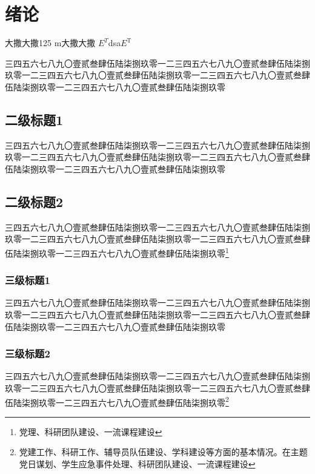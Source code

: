 \documentclass[master,academic]{ysuthesis} %
\begin{document}

	\customizedtableofcontents

	\chapter{绪论}
		大撒大撒125 m大撒大撒 $E^T$dsa$E^{\mathrm{T}}$

		三四五六七八九〇壹贰叁肆伍陆柒捌玖零一二三四五六七八九〇壹贰叁肆伍陆柒捌玖零一二三四五六七八九〇壹贰叁肆伍陆柒捌玖零一二三四五六七八九〇壹贰叁肆伍陆柒捌玖零一二三四五六七八九〇壹贰叁肆伍陆柒捌玖零

	\section{二级标题1}

		三四五六七八九〇壹贰叁肆伍陆柒捌玖零一二三四五六七八九〇壹贰叁肆伍陆柒捌玖零一二三四五六七八九〇壹贰叁肆伍陆柒捌玖零一二三四五六七八九〇壹贰叁肆伍陆柒捌玖零一二三四五六七八九〇壹贰叁肆伍陆柒捌玖零

	\section{二级标题2}

		三四五六七八九〇壹贰叁肆伍陆柒捌玖零一二三四五六七八九〇壹贰叁肆伍陆柒捌玖零一二三四五六七八九〇壹贰叁肆伍陆柒捌玖零一二三四五六七八九〇壹贰叁肆伍陆柒捌玖零一二三四五六七八九〇壹贰叁肆伍陆柒捌玖零\footnote{党理、科研团队建设、一流课程建设}


	\subsection{三级标题1}

		三四五六七八九〇壹贰叁肆伍陆柒捌玖零一二三四五六七八九〇壹贰叁肆伍陆柒捌玖零一二三四五六七八九〇壹贰叁肆伍陆柒捌玖零一二三四五六七八九〇壹贰叁肆伍陆柒捌玖零一二三四五六七八九〇壹贰叁肆伍陆柒捌玖零

	\subsection{三级标题2}

		三四五六七八九〇壹贰叁肆伍陆柒捌玖零一二三四五六七八九〇壹贰叁肆伍陆柒捌玖零一二三四五六七八九〇壹贰叁肆伍陆柒捌玖零一二三四五六七八九〇壹贰叁肆伍陆柒捌玖零一二三四五六七八九〇壹贰叁肆伍陆柒捌玖零\footnote{党建工作、科研工作、辅导员队伍建设、学科建设等方面的基本情况。在主题党日谋划、学生应急事件处理、科研团队建设、一流课程建设}
\end{document}
